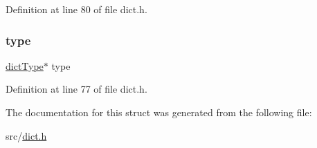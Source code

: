 Definition at line 80 of file dict.\+h.

\mbox{\label{structdict_a2db48c015f8daf59c847bd365a95b676}} 
\subsubsection{\texorpdfstring{type}{type}}
{\footnotesize\ttfamily \hyperlink{structdict_type}{dict\+Type}$\ast$ type}



Definition at line 77 of file dict.\+h.



The documentation for this struct was generated from the following file\+:\begin{DoxyCompactItemize}
\item 
src/\hyperlink{dict_8h}{dict.\+h}\end{DoxyCompactItemize}
